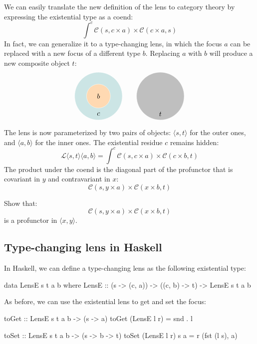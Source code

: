 \documentclass[DaoFP]{subfiles}
\begin{document}
We can easily translate the new definition of the lens to category theory by expressing the existential type as a coend:
\[ \int^{c} \mathcal{C}(s, c \times a) \times  \mathcal{C}(c \times a, s) \]
In fact, we can generalize it to a type-changing lens, in which the focus $a$ can be replaced with a new focus of a different type $b$. Replacing $a$ with $b$ will produce a new composite object $t$:
\[
\begin{tikzpicture}
\filldraw[fill=blue!50!green!20, draw=white] (0, 0) circle (1.2);
\filldraw[fill=orange!30, draw=white] (0, 0) circle (0.6);
\node at (0, 0) {$b$};
\node at (0, -0.9) {$c$};
\end{tikzpicture}
\hspace{20pt}
\begin{tikzpicture}
\filldraw[fill=gray!50, draw=white] (0, 0) circle (1.2);
\node at (0, -0.9) {$t$};
\end{tikzpicture}
\]

The lens is now parameterized by two pairs of objects: $\langle s, t\rangle$ for the outer ones, and $ \langle a, b \rangle$ for the inner ones. The existential residue $c$ remains hidden:
\[ \mathcal{L}\langle s, t\rangle \langle a, b \rangle = \int^{c} \mathcal{C}(s, c \times a) \times  \mathcal{C}(c \times b, t) \]
The product under the coend is the diagonal part of the profunctor that is covariant in $y$ and contravariant in $x$:
\[ \mathcal{C}(s, y \times a) \times  \mathcal{C}(x \times b, t) \]
\begin{exercise}
Show that:
\[ \mathcal{C}(s, y \times a) \times  \mathcal{C}(x \times b, t) \]
is a profunctor in $\langle x, y\rangle$.
\end{exercise}


\subsection{Type-changing lens in Haskell}
In Haskell, we can define a type-changing lens as the following existential type:
\begin{haskell}
data LensE s t a b where
  LensE :: (s -> (c, a)) -> ((c, b) -> t) -> LensE s t a b
\end{haskell}

As before, we can use the existential lens to get and set the focus:
\begin{haskell}
toGet :: LensE s t a b -> (s -> a)
toGet (LensE l r) = snd . l

toSet :: LensE s t a b -> (s -> b -> t)
toSet (LensE l r) s a = r (fst (l s), a)
\end{haskell}
\end{document}
